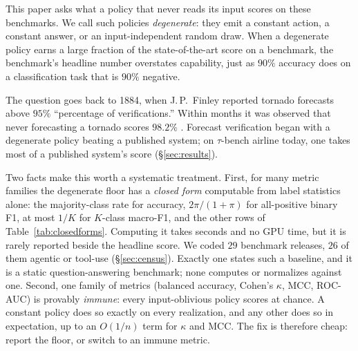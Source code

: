\documentclass{article}
\theoremstyle{plain}
\theoremstyle{definition}
\begin{document}
This paper asks what a policy that never reads its input scores on these benchmarks. We call such policies \emph{degenerate}: they emit a constant action, a constant answer, or an input-independent random draw. When a degenerate policy earns a large fraction of the state-of-the-art score on a benchmark, the benchmark's headline number overstates capability, just as $90\%$ accuracy does on a classification task that is $90\%$ negative.

The question goes back to 1884, when J.\,P.\ Finley reported tornado forecasts above $95\%$ ``percentage of verifications.'' Within months it was observed that never forecasting a tornado scores $98.2\%$ \citep{murphy1996finley}. Forecast verification began with a degenerate policy beating a published system; on $\tau$-bench airline today, one takes most of a published system's score (\S\ref{sec:results}).

Two facts make this worth a systematic treatment. First, for many metric families the degenerate floor has a \emph{closed form} computable from label statistics alone: the majority-class rate for accuracy, $2\pi/(1+\pi)$ for all-positive binary F1, at most $1/K$ for $K$-class macro-F1, and the other rows of Table~\ref{tab:closedforms}. Computing it takes seconds and no GPU time, but it is rarely reported beside the headline score. We coded $29$ benchmark releases, $26$ of them agentic or tool-use (\S\ref{sec:census}). Exactly one states such a baseline, and it is a static question-answering benchmark; none computes or normalizes against one. Second, one family of metrics (balanced accuracy, Cohen's $\kappa$, MCC, ROC-AUC) is provably \emph{immune}: every input-oblivious policy scores at chance. A constant policy does so exactly on every realization, and any other does so in expectation, up to an $O(1/n)$ term for $\kappa$ and MCC. The fix is therefore cheap: report the floor, or switch to an immune metric.
\end{document}
